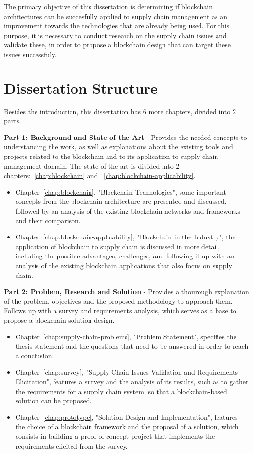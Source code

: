 The primary objective of this dissertation is determining if blockchain architectures can be succesfully applied to supply chain management as an improvement towards the technologies that are already being used. For this purpose, it is necessary to conduct research on the supply chain issues and validate these, in order to propose a blockchain design that can target these issues successfuly. 

\section{Dissertation Structure} \label{sec:struct}

Besides the introduction, this dissertation has 6 more chapters, divided into 2 parts.

\par \textbf{Part 1: Background and State of the Art} - Provides the needed concepts to understanding the work, as well as explanations about the existing tools and projects related to the blockchain and to its application to supply chain management domain.
 The state of the art is divided into 2 chapters:~\ref{chap:blockchain} and ~\ref{chap:blockchain-applicability}.
\begin{itemize}
  \item Chapter~\ref{chap:blockchain}, "Blockchain Technologies", some important concepts from the blockchain architecture are presented and discussed, followed by an analysis of the existing blockchain networks and frameworks and their comparison.
  \item Chapter~\ref{chap:blockchain-applicability}, "Blockchain in the Industry", the application of blockchain to supply chain is discussed in more detail, including the possible advantages, challenges, and following it up with an analysis of the existing blockchain applications that also focus on supply chain. 
\end{itemize}

\par \textbf{Part 2: Problem, Research and Solution} - Provides a thourough explanation of the problem, objectives and the proposed methodology to approach them. Follows up with a survey and requirements analysis, which serves as a base to propose a blockchain solution design. 
\begin{itemize}
  \item Chapter~\ref{chap:supply-chain-problems}, "Problem Statement", specifies the thesis statement and the questions that need to be answered in order to reach a conclusion.
  \item Chapter~\ref{chap:survey}, "Supply Chain Issues Validation and Requirements Elicitation", features a survey and the analysis of its results, such as to gather the requirements for a supply chain system, so that a blockchain-based solution can be proposed.
  \item Chapter~\ref{chap:prototype}, "Solution Design and Implementation", features the choice of a blockchain framework and the proposal of a solution, which consists in building a proof-of-concept project that implements the requirements elicited from the survey.
\end{itemize}

